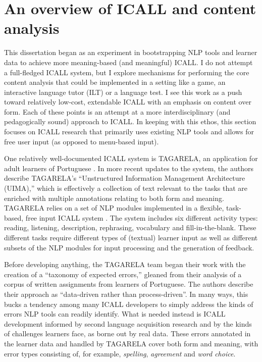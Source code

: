 \section{An overview of ICALL and content analysis}
\label{section:ICALLoverview}
This dissertation began as an experiment in bootstrapping NLP tools and learner data to achieve more meaning-based (and meaningful) ICALL. I do not attempt a full-fledged ICALL system, but I explore mechanisms for performing the core content analysis that could be implemented in a setting like a game, an interactive language tutor (ILT) or a language test. I see this work as a push toward relatively low-cost, extendable ICALL with an emphasis on content over form. Each of these points is an attempt at a more interdisciplinary (and pedagogically sound) approach to ICALL. In keeping with this ethos, this section focuses on ICALL research that primarily uses existing NLP tools and allows for free user input (as opposed to menu-based input).

One relatively well-documented ICALL system is TAGARELA, an application for adult learners of Portuguese \cite{amaral2007designing,amaral:meurers:user:07}. In more recent updates to the system, the authors describe TAGARELA's ``Unstructured Information Management Architecture (UIMA),'' which is effectively a collection of text relevant to the tasks that are enriched with multiple annotations relating to both form and meaning. TAGARELA relies on a set of NLP modules implemented in a flexible, task-based, free input ICALL system \cite{Amaral.Meurers.Ziai-11}. The system includes six different activity types: reading, listening, description, rephrasing, vocabulary and fill-in-the-blank. These different tasks require different types of (textual) learner input as well as different subsets of the NLP modules for input processing and the generation of feedback.

Before developing anything, the TAGARELA team began their work with the creation of a ``taxonomy of expected errors,'' gleaned from their analysis of a corpus of written assignments from learners of Portuguese. The authors describe their approach as ``data-driven rather than process-driven''. In many ways, this bucks a tendency among many ICALL developers to simply address the kinds of errors NLP tools can readily identify. What is needed instead is ICALL development informed by second language acquisition research and by the kinds of challenges learners face, as borne out by real data. These errors annotated in the learner data and handled by TAGARELA cover both form and meaning, with error types consisting of, for example, \textit{spelling}, \textit{agreement} and \textit{word choice}.


